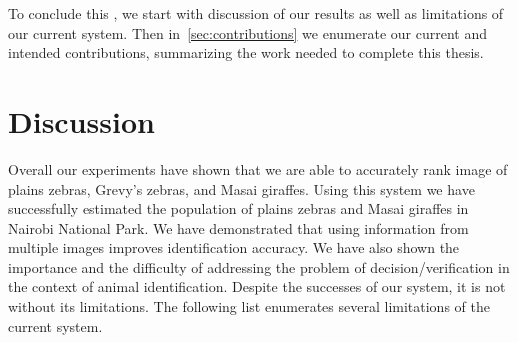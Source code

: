     To conclude this \thesis{}, we start with discussion of our results as
      well as limitations of our current system.
    Then in~\cref{sec:contributions} we enumerate our current and intended
      contributions, summarizing the work needed to complete this thesis.

    \section{Discussion}\label{sec:discussresult} 

        Overall our experiments have shown that we are able to accurately rank
          image of plains zebras, Grevy's zebras, and Masai giraffes.
        Using this system we have successfully estimated the population of
          plains zebras and Masai giraffes in Nairobi National Park.
        We have demonstrated that using information from multiple images
          improves identification accuracy.
        We have also shown the importance and the difficulty of addressing the
          problem of decision/verification in the context of animal
          identification.
        Despite the successes of our system, it is not without its
          limitations.
        The following list enumerates several limitations of the current
          system.

